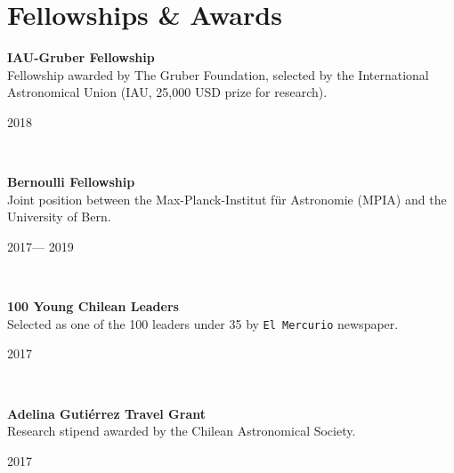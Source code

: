 \documentclass[12pt, a4paper]{article} %
\begin{document}
\section*{Fellowships \& Awards}

\begin{minipage}[t]{0.7\textwidth}
\begin{flushleft}%
  \setlength{\leftskip}{0.2cm}%
\textbf{IAU-Gruber Fellowship}\\
Fellowship awarded by The Gruber Foundation, selected by the International Astronomical Union (IAU, 25,000 USD prize for research).
\end{flushleft}
\end{minipage}
\begin{minipage}[t]{0.3\textwidth}
\hfill 2018
\end{minipage}\\

\begin{minipage}[t]{0.7\textwidth}
\begin{flushleft}%
  \setlength{\leftskip}{0.2cm}%
\textbf{Bernoulli Fellowship}\\
Joint position between the Max-Planck-Institut f\"ur Astronomie (MPIA) and the University of Bern.
\end{flushleft}
\end{minipage}
\begin{minipage}[t]{0.3\textwidth}
\hfill 2017--- 2019
\end{minipage}\\

\begin{minipage}[t]{0.7\textwidth}
\begin{flushleft}%
  \setlength{\leftskip}{0.2cm}%
\textbf{100 Young Chilean Leaders}\\
Selected as one of the 100 leaders under 35 by \texttt{El Mercurio} newspaper.
\end{flushleft}
\end{minipage}
\begin{minipage}[t]{0.3\textwidth}
\hfill 2017
\end{minipage}\\

\begin{minipage}[t]{0.7\textwidth}
\begin{flushleft}%
  \setlength{\leftskip}{0.2cm}%
\textbf{Adelina Guti\'errez Travel Grant}\\
Research stipend awarded by the Chilean Astronomical Society.
\end{flushleft}
\end{minipage}
\begin{minipage}[t]{0.3\textwidth}
\hfill 2017
\end{minipage}\\
\end{document}
